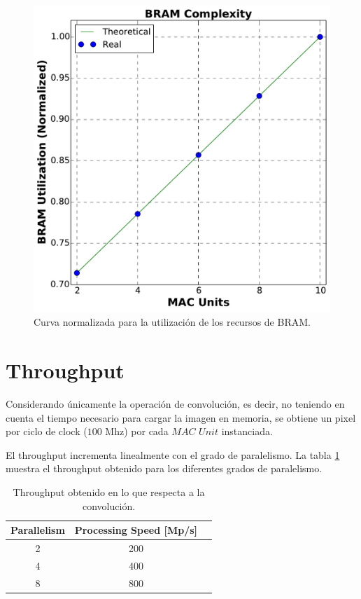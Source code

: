 \begin{figure}
\centering
\includegraphics[scale=0.5]{BRAM_c2}
\caption{Curva normalizada para la utilización de los recursos de BRAM.}
\label{bram_n}
\end{figure}

\section{Throughput}

Considerando únicamente la operación de convolución, es decir, no teniendo en
cuenta el tiempo necesario para cargar la imagen en memoria, se obtiene un pixel
por ciclo de clock ($100$ Mhz) por cada $MAC$ $Unit$ instanciada. 

El throughput incrementa linealmente con el grado de paralelismo. La tabla
\ref{conv_tp} muestra el throughput obtenido para los diferentes grados de
paralelismo.

\begin{table}
\renewcommand{\arraystretch}{1.3}
\caption{Throughput obtenido en lo que respecta a la convolución.}
\label{conv_tp}
\centering
\begin{tabular}{|c|c|c|}
 \hline
  \textbf{Parallelism}  &    \textbf{Processing Speed [Mp/s]}  \\ \hline
          2             &                     200              \\ \hline
          4             &                     400              \\ \hline
          8             &                     800              \\ \hline
\end{tabular}           
\end{table}